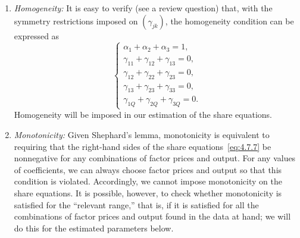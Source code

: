 \begin{enumerate}
\item \textit{Homogeneity:}\quad
It is easy to verify (see a review question) that, with the symmetry
restrictions imposed on $(\gamma_{jk})$, the homogeneity condition can be expressed as
\begin{equation}
\begin{cases}
\alpha_1 + \alpha_2 + \alpha_3 = 1, \\
\gamma_{11} + \gamma_{12} + \gamma_{13} = 0, \\
\gamma_{12} + \gamma_{22} + \gamma_{23} = 0, \\
\gamma_{13} + \gamma_{23} + \gamma_{33} = 0, \\
\gamma_{1Q} + \gamma_{2Q} + \gamma_{3Q} = 0.
\end{cases}
\label{eq:4.7.10}
\end{equation}
Homogeneity will be imposed in our estimation of the share equations.

\item \textit{Monotonicity:}\quad
Given Shephard's lemma, monotonicity is equivalent to requiring
that the right-hand sides of the share equations~\eqref{eq:4.7.7} be nonnegative for
any combinations of factor prices and output. For any values of coefficients,
we can always choose factor prices and output so that this condition is violated.
Accordingly, we cannot impose monotonicity on the share equations. It
is possible, however, to check whether monotonicity is satisfied for the ``relevant
range,'' that is, if it is satisfied for all the combinations of factor prices and
output found in the data at hand; we will do this for the estimated parameters
below.


\end{enumerate}
